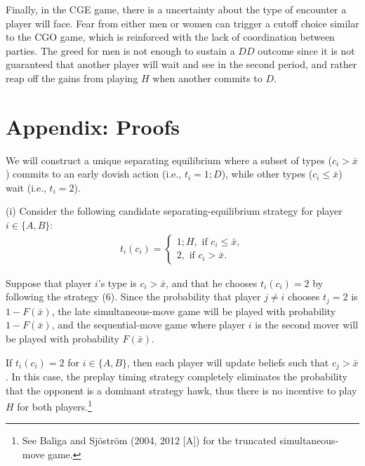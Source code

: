 \documentclass[12pt,english]{article}
\begin{document}
Finally, in the CGE game, there is a uncertainty about the type of encounter a player will face. Fear from either men or women can trigger a cutoff choice similar to the CGO game, which is reinforced with the lack of coordination between parties. The greed for men is not enough to sustain a $DD$ outcome since it is not guaranteed that another player will wait and see in the second period, and rather reap off the gains from playing $H$ when another commits to $D$.



\newpage

\section*{Appendix: Proofs}

We will construct a unique separating equilibrium where a subset of types ($c_i > \bar{x}$) commits to an early dovish action (i.e., $t_i=1;D$), while other types ($c_i \leq \bar{x}$) wait (i.e., $t_i=2$).\par
(i) Consider the following candidate separating-equilibrium strategy for player $i \in \{A,B\}$:
\begin{align}
 t_i(c_i)=
 \begin{cases} 1; H, \mbox{ if } c_i \leq \bar{x}, \\
 2, \mbox{ if } c_i > \bar{x}.
 \end{cases}
\end{align}\par
Suppose that player $i$'s type is $c_i > \bar{x}$, and that he chooses $t_i(c_i)=2$ by following the strategy (6). Since the probability that player $j \neq i$ chooses $t_j=2$ is $1-F(\bar{x})$, the late simultaneous-move game will be played with probability $1-F(\bar{x})$, and the sequential-move game where player $i$ is the second mover will be played with probability $F(\bar{x})$.\par
If $t_i(c_i)=2$ for $i \in \{A,B\}$, then each player will update beliefs such that $c_j > \bar{x}$. In this case, the preplay timing strategy completely eliminates the probability that the opponent is a dominant strategy hawk, thus there is no incentive to play $H$ for both players.\footnote{See Baliga and Sj\"ostr\"om (2004, 2012 [A]) for the truncated simultaneous-move game.} \par 
\end{document}
